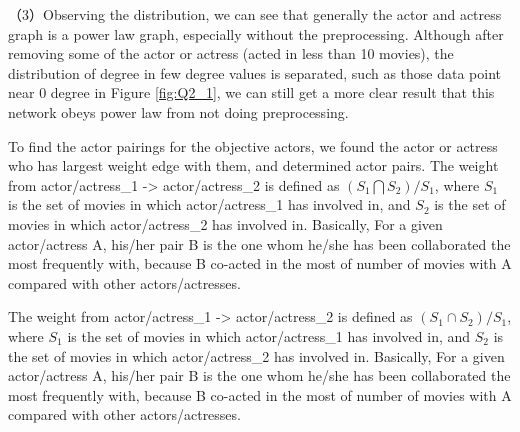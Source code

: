 （3）Observing the distribution, we can see that generally the actor and actress graph is a power law graph, especially without the preprocessing. Although after removing some of the actor or actress (acted in less than 10 movies), the distribution of degree in few degree values is separated, such as those data point near 0 degree in Figure \ref{fig:Q2_1}, we can still get a more clear result that this network obeys power law from not doing preprocessing. 


To find the actor pairings for the objective actors, we found the actor or actress who has largest weight edge with them, and determined actor pairs. The weight from actor/actress_1 -> actor/actress_2 is defined as $(S_1 \bigcap S_2) / S_1$, where $S_1$ is the set of movies in which actor/actress_1 has involved in, and $S_2$ is the set of movies in which actor/actress_2 has involved in. Basically, For a given actor/actress A, his/her pair B is the one whom he/she has been collaborated the most frequently with, because B co-acted in the most of number of movies with A compared with other actors/actresses.


The weight from actor/actress_1 -> actor/actress_2 is defined as $(S_1 \cap S_2) / S_1$, where $S_1$ is the set of movies in which actor/actress_1 has involved in, and $S_2$ is the set of movies in which actor/actress_2 has involved in. Basically, For a given actor/actress A, his/her pair B is the one whom he/she has been collaborated the most frequently with, because B co-acted in the most of number of movies with A compared with other actors/actresses.
